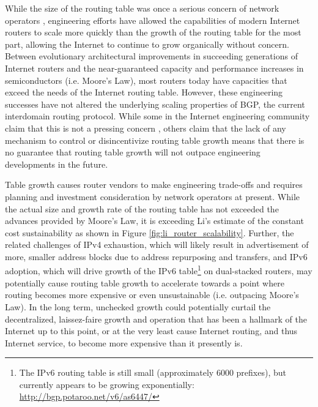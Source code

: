 While the size of the routing table was once a serious concern of network
operators , engineering efforts have allowed the capabilities of
modern Internet routers to scale more quickly than the growth of the routing
table for the most part, allowing the Internet to continue to grow organically
without concern. Between evolutionary architectural improvements in succeeding
generations of Internet routers \cite{McKeown:2006kx} and the near-guaranteed
capacity and performance increases in semiconductors (i.e. Moore's Law), most
routers today have capacities that exceed the needs of the Internet routing
table. However, these engineering successes have not altered the underlying
scaling properties of BGP, the current interdomain routing protocol. While some
in the Internet engineering community claim that this is not a pressing concern
\cite{Huston:2011ys, Huston:2009dq}, others \cite{Li:2011vn} claim that the
lack of any mechanism to control or disincentivize routing table growth means
that there is no guarantee that routing table growth will not outpace
engineering developments in the future.

Table growth causes router vendors to make engineering trade-offs
\cite{Li:2011vn, Fall:2009fk} and requires planning and investment
consideration by network operators \cite{Zhao:2010fu} at present. While the
actual size and growth rate of the routing table has not exceeded the advances
provided by Moore's Law, it is exceeding Li's estimate of the constant cost
sustainability as shown in Figure \ref{fig:li_router_scalability}. Further, the
related challenges of IPv4 exhaustion, which will likely result in
advertisement of more, smaller address blocks due to address repurposing and
transfers, and IPv6 adoption, which will drive growth of the IPv6
table\footnote{The IPv6 routing table is still small (approximately 6000
prefixes), but currently appears to be growing exponentially:
\url{http://bgp.potaroo.net/v6/as6447/}} on dual-stacked routers, may
potentially cause routing table growth to accelerate towards a point where
routing becomes more expensive or even unsustainable (i.e. outpacing Moore's
Law). In the long term, unchecked growth could potentially curtail the
decentralized, laissez-faire growth and operation that has been a hallmark of
the Internet up to this point, or at the very least cause Internet routing, and
thus Internet service, to become more expensive than it presently is.

